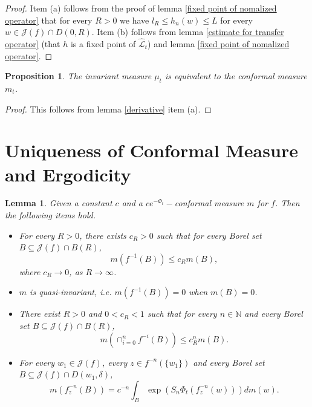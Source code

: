 \documentclass[12pt,reqno]{amsart}
\newtheorem{lemma}[theorem]{Lemma}
\newtheorem{proposition}[theorem]{Proposition}
\begin{document}
\begin{proof}
    Item (a) follows from the proof of lemma \ref{fixed point of nomalized operator} that for every $R>0$ we have $l_R \leq h_n(w)\leq L$ for every $w\in \mathcal{J}(f)\cap D(0,R)$. Item (b) follows from lemma \ref{estimate for transfer operator} (that $h$ is a fixed point of $\hat{\mathcal{L}}_t$) and lemma \ref{fixed point of nomalized operator}.
\end{proof}
\begin{proposition}\label{equivalence of measures}
    The invariant measure $\mu_t$ is equivalent to the conformal measure $m_t$.
\end{proposition}
\begin{proof}
    This follows from lemma \ref{derivative} item (a).
\end{proof}
\section{Uniqueness of Conformal Measure and Ergodicity}
\begin{lemma}\label{quasi-invariant}
    Given a constant $c$ and a $ce^{-\Phi_t}-$conformal measure $m$ for $f$. Then the following items hold.
    \begin{itemize}
        \item[(a)] For every $R>0$, there exists $c_R>0$ such that for every Borel set  $B \subseteq \mathcal{J}(f) \cap B(R)$,
    $$m(f^{-1}(B))\leq c_R m(B),$$
    where $c_R \to 0$, as $R\to \infty$.
        \item[(b)]  $m$ is quasi-invariant, i.e. $m(f^{-1}(B))=0$ when $m(B)=0$.
        \item[(c)] There exist $R>0$ and $0<c_R<1$ such that for every $n \in \mathbb{N}$ and every Borel set  $B \subseteq \mathcal{J}(f) \cap B(R)$,
        $$m \left( \cap_{i=0}^{n}f^{-i}(B) \right) \leq c_R^nm(B).$$
        \item[(d)]  For every $w_1\in \mathcal{J}(f)$, every $z\in f^{-n}(\{w_1\})$ and every Borel set  $B \subseteq \mathcal{J}(f) \cap D(w_1,\delta)$,
    $$m(f_z^{-n}(B))= c^{-n}\int_B \exp\left(S_n\Phi_t(f_z^{-n}(w))\right)dm(w).$$
    \end{itemize}
\end{lemma}
\end{document}
